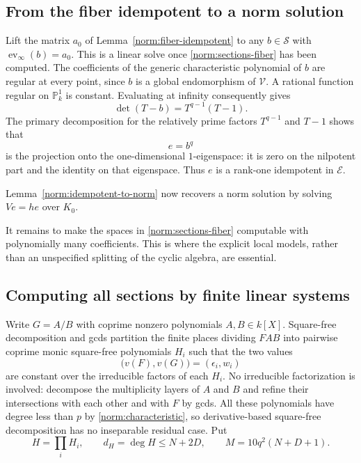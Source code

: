 \subsection{From the fiber idempotent to a norm solution}

Lift the matrix $a_0$ of Lemma~\ref{norm:fiber-idempotent} to any
$b\in\mathcal S$ with $\operatorname{ev}_\infty(b)=a_0$.  This is a
linear solve once \eqref{norm:sections-fiber} has been computed.  The
coefficients of the generic characteristic polynomial of $b$ are
regular at every point, since $b$ is a global endomorphism of
$\mathcal V$.  A rational function regular on $\mathbb P^1_k$ is
constant.  Evaluating at infinity consequently gives
\[
 \det(T-b)=T^{q-1}(T-1).
\]
The primary decomposition for the relatively prime factors
$T^{q-1}$ and $T-1$ shows that
\begin{equation}\label{norm:generic-idempotent}
 e=b^q
\end{equation}
is the projection onto the one-dimensional $1$-eigenspace: it is zero
on the nilpotent part and the identity on that eigenspace.  Thus $e$
is a rank-one idempotent in $\mathcal E$.

Lemma~\ref{norm:idempotent-to-norm} now recovers a norm solution by
solving $Ve=he$ over $K_0$.

It remains to make the spaces in \eqref{norm:sections-fiber}
computable with polynomially many coefficients.  This is where the
explicit local models, rather than an unspecified splitting of the
cyclic algebra, are essential.

\subsection{Computing all sections by finite linear systems}
\label{norm:section-computation}

Write $G=A/B$ with coprime nonzero polynomials $A,B\in k[X]$.
Square-free decomposition and gcds partition the finite places
dividing $FAB$ into pairwise coprime monic square-free polynomials
$H_i$ such that the two values
\[
 \bigl(v(F),v(G)\bigr)=(\epsilon_i,w_i)
\]
are constant over the irreducible factors of each $H_i$.
No irreducible factorization is involved: decompose the multiplicity
layers of $A$ and $B$ and refine their intersections with each other
and with $F$ by gcds.  All these polynomials have degree less than
$p$ by \eqref{norm:characteristic}, so derivative-based square-free
decomposition has no inseparable residual case.  Put
\begin{equation}\label{norm:H-M}
 H=\prod_i H_i,\qquad d_H=\deg H\le N+2D,
 \qquad M=10q^2(N+D+1).
\end{equation}

